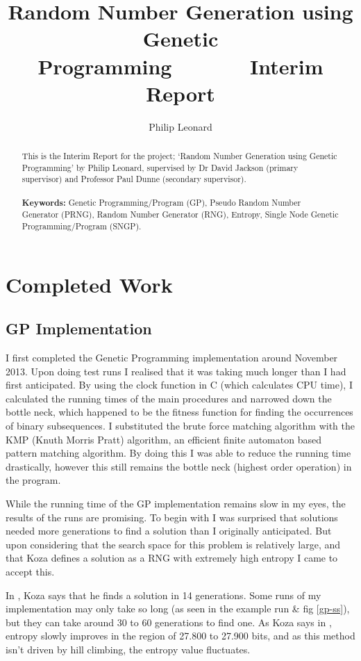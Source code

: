 \documentclass[a4paper,10.5pt]{article}
\title{Random Number Generation using Genetic Programming\ \ \ \  \ \ \      Interim Report}
\author{Philip Leonard}
\date{}
\begin{document}
\maketitle
\begin{abstract}
This is the Interim Report for the project; `Random Number Generation using Genetic Programming' by Philip Leonard, supervised by Dr David Jackson (primary supervisor) and Professor Paul Dunne (secondary supervisor).\\\\
\textbf{Keywords:} Genetic Programming/Program (GP), Pseudo Random Number Generator (PRNG), Random Number Generator (RNG), Entropy, Single Node Genetic Programming/Program (SNGP).
\end{abstract}
\section{Completed Work}
\subsection{GP Implementation}

I first completed the Genetic Programming implementation around November 2013. Upon doing test runs I realised that it was taking much longer than I had first anticipated. By using the clock function in C (which calculates CPU time), I calculated the running times of the main procedures and narrowed down the bottle neck, which happened to be the fitness function for finding the occurrences of binary subsequences. I substituted the brute force matching algorithm with the KMP (Knuth Morris Pratt) algorithm, an  efficient finite automaton based pattern matching algorithm. By doing this I was able to reduce the running time drastically, however this still remains the bottle neck (highest order operation) in the program.

While the running time of the GP implementation remains slow in my eyes, the results of the runs are promising. To begin with I was surprised that solutions needed more generations to find a solution than I originally anticipated. But upon considering that the search space for this problem is relatively large, and that Koza defines a solution as a RNG with extremely high entropy I came to accept this.

In \cite[p.6]{kozarng}, Koza says that he finds a solution in 14 generations. Some runs of my implementation may only take so long (as seen in the example run \& fig \ref{gp-ss}), but they can take around 30 to 60 generations to find one. As Koza says in \cite[p.6]{kozarng}, entropy slowly improves in the region of 27.800 to 27.900 bits, and as this method isn't driven by hill climbing, the entropy value fluctuates.\\
\end{document}
